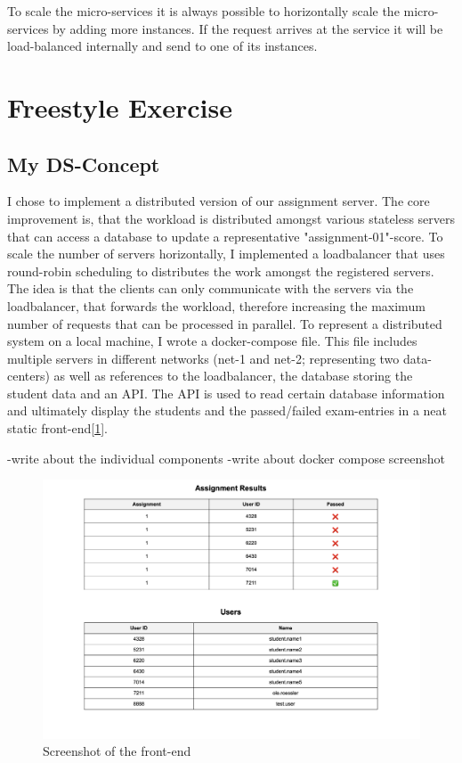 \documentclass{article}
\begin{document}
To scale the micro-services it is always possible to horizontally scale the micro-services by adding more instances. If the request arrives at the service it will be load-balanced internally and send to one of its instances.


\section{Freestyle Exercise}
\subsection{My DS-Concept}
I chose to implement a distributed version of our assignment server. 
The core improvement is, that the workload is distributed amongst various stateless servers that can access a database to update a representative "assignment-01"-score. To scale the number of servers horizontally, I implemented a loadbalancer that uses round-robin scheduling to distributes the work amongst the registered servers. The idea is that the clients can only communicate with the servers via the loadbalancer, that forwards the workload, therefore increasing the maximum number of requests that can be processed in parallel. 
To represent a distributed system on a local machine, I wrote a docker-compose file. This file includes multiple servers in different networks (net-1 and net-2; representing two data-centers) as well as references to the loadbalancer, the database storing the student data and an API. The API is used to read certain database information and ultimately display the students and the passed/failed exam-entries in a neat static front-end[\ref{fig:frontend}].


-write about the individual components 
-write about docker compose screenshot


\begin{figure}
    \centering
    \includegraphics[width=1\linewidth]{images/frontend_screenshot.png}
    \caption{Screenshot of the front-end}
    \label{fig:frontend}
\end{figure}
\end{document}
